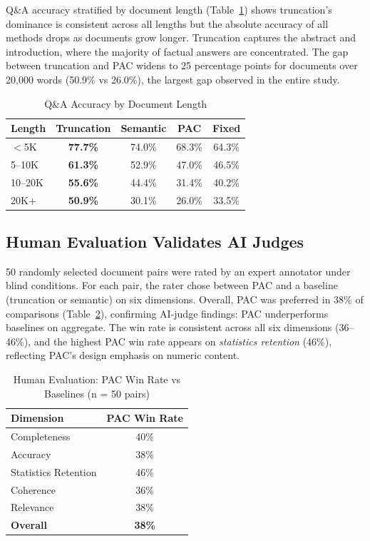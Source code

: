 \documentclass[journal]{IEEEtran}
\begin{document}
Q\&A accuracy stratified by document length (Table~\ref{tab:qa_length}) shows truncation's dominance is consistent across all lengths but the absolute accuracy of all methods drops as documents grow longer. Truncation captures the abstract and introduction, where the majority of factual answers are concentrated. The gap between truncation and PAC widens to 25 percentage points for documents over 20{,}000 words (50.9\% vs 26.0\%), the largest gap observed in the entire study.

\begin{table}[h]
\centering
\caption{Q\&A Accuracy by Document Length}
\label{tab:qa_length}
\footnotesize
\begin{tabular}{lcccc}
\toprule
\textbf{Length} & \textbf{Truncation} & \textbf{Semantic} & \textbf{PAC} & \textbf{Fixed} \\
\midrule
$<$5K & \textbf{77.7\%} & 74.0\% & 68.3\% & 64.3\% \\
5--10K & \textbf{61.3\%} & 52.9\% & 47.0\% & 46.5\% \\
10--20K & \textbf{55.6\%} & 44.4\% & 31.4\% & 40.2\% \\
20K+ & \textbf{50.9\%} & 30.1\% & 26.0\% & 33.5\% \\
\bottomrule
\end{tabular}
\end{table}

\subsection{Human Evaluation Validates AI Judges}

50 randomly selected document pairs were rated by an expert annotator under blind conditions. For each pair, the rater chose between PAC and a baseline (truncation or semantic) on six dimensions. Overall, PAC was preferred in 38\% of comparisons (Table~\ref{tab:human}), confirming AI-judge findings: PAC underperforms baselines on aggregate. The win rate is consistent across all six dimensions (36--46\%), and the highest PAC win rate appears on \textit{statistics retention} (46\%), reflecting PAC's design emphasis on numeric content.

\begin{table}[h]
\centering
\caption{Human Evaluation: PAC Win Rate vs Baselines (n = 50 pairs)}
\label{tab:human}
\begin{tabular}{lc}
\toprule
\textbf{Dimension} & \textbf{PAC Win Rate} \\
\midrule
Completeness & 40\% \\
Accuracy & 38\% \\
Statistics Retention & 46\% \\
Coherence & 36\% \\
Relevance & 38\% \\
\textbf{Overall} & \textbf{38\%} \\
\bottomrule
\end{tabular}
\end{table}
\end{document}
